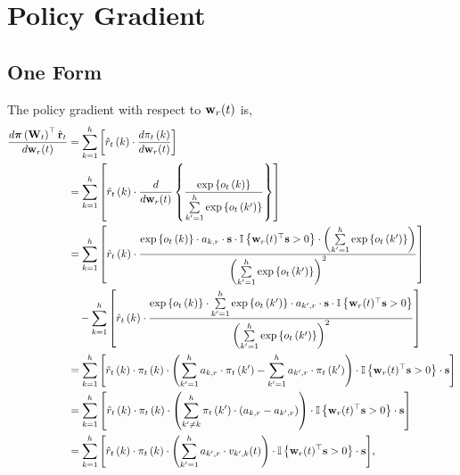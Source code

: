 \section{Policy Gradient}

\subsection{One Form}

The policy gradient with respect to ${\mathbf{w}}_r(t)$ is,
\begin{equation*}
\label{eq:gradient_form_one}
\begin{split}
	\frac{d {\boldsymbol{\pi}}\left( {\mathbf{W}}_t \right)^\top \hat{{\mathbf{r}}}_t}{d {\mathbf{w}}_r(t)} &=  \sum\limits_{k=1}^{h}\left[ \hat{r}_t\left(k\right) \cdot \frac{d \pi_t\left(k\right)}{d {\mathbf{w}}_r(t)} \right]  \\
	&= \sum\limits_{k=1}^{h}\left[ \hat{r}_t\left(k\right) \cdot \frac{d}{d {\mathbf{w}}_r(t)} \left\{ \frac{\exp\left\{ o_t\left(k\right) \right\}}{\sum\limits_{k^\prime = 1}^{h}{\exp\left\{ o_{t}\left(k^\prime\right) \right\}}} \right\} \right] \\
	&= \sum\limits_{k=1}^{h}\left[ \hat{r}_t\left(k\right) \cdot \frac{ \exp\left\{ o_t\left(k\right) \right\} \cdot a_{k,r} \cdot {\mathbf{s}} \cdot {\mathbb{I}}\left\{ {\mathbf{w}}_r(t)^\top {\mathbf{s}} > 0 \right\} \cdot \left( \sum\limits_{k^\prime = 1}^{h}{\exp\left\{ o_{t}\left(k^\prime\right) \right\}} \right) }{ \left( \sum\limits_{k^\prime = 1}^{h}{\exp\left\{ o_{t}\left(k^\prime\right) \right\}} \right)^2 } \right] \\
	&\quad -\sum\limits_{k=1}^{h}\left[ \hat{r}_t\left(k\right) \cdot \frac{ \exp\left\{ o_t\left(k\right) \right\} \cdot \sum\limits_{k^\prime = 1}^{h}{\exp\left\{ o_{t}\left(k^\prime\right) \right\}} \cdot a_{k^\prime,r} \cdot {\mathbf{s}} \cdot {\mathbb{I}}\left\{ {\mathbf{w}}_r(t)^\top {\mathbf{s}} > 0 \right\} }{ \left( \sum\limits_{k^\prime = 1}^{h}{\exp\left\{ o_{t}\left(k^\prime\right) \right\}} \right)^2 } \right] \\
	&= \sum\limits_{k=1}^{h}{ \left[ \hat{r}_t\left(k\right) \cdot \pi_t\left(k\right) \cdot \left( \sum\limits_{k^\prime = 1}^{h}{ a_{k,r} \cdot \pi_{t}\left(k^\prime\right) } - \sum\limits_{k^\prime = 1}^{h}{ a_{k^\prime,r} \cdot \pi_{t}\left(k^\prime\right) } \right) \cdot {\mathbb{I}}\left\{ {\mathbf{w}}_r(t)^\top {\mathbf{s}} > 0 \right\} \cdot {\mathbf{s}} \right] } \\
	&= \sum\limits_{k=1}^{h}{ \left[ \hat{r}_t\left(k\right) \cdot \pi_t\left(k\right) \cdot \left( \sum\limits_{k^\prime \not= k}^{h}{ \pi_{t}\left(k^\prime\right) \cdot \left( a_{k,r} - a_{k^\prime,r} \right)  } \right) \cdot {\mathbb{I}}\left\{ {\mathbf{w}}_r(t)^\top {\mathbf{s}} > 0 \right\} \cdot {\mathbf{s}} \right] } \\
	&= \sum\limits_{k=1}^{h}{ \left[ \hat{r}_t\left(k\right) \cdot \pi_t\left(k\right) \cdot \left( \sum\limits_{k^\prime = 1}^{h}{ a_{k^\prime,r}  \cdot v_{k^\prime,k}(t) } \right) \cdot {\mathbb{I}}\left\{ {\mathbf{w}}_r(t)^\top {\mathbf{s}} > 0 \right\} \cdot {\mathbf{s}} \right] },
\end{split}
\end{equation*}
